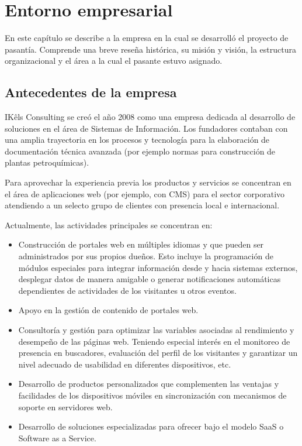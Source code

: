 \chapter{Entorno empresarial} \label{entornoEmpresarial}
En este capítulo se describe a la empresa en la cual se desarrolló el proyecto de pasantía. Comprende una breve reseña histórica, su misión y visión, la estructura organizacional y el área a la cual el pasante estuvo asignado.

\section{Antecedentes de la empresa} \label{antecedentesEmpresa}
IKêls Consulting \cite{ikelsAbout} se creó el año 2008 como una empresa dedicada al desarrollo de soluciones en el área de Sistemas de Información. Los fundadores contaban con una amplia trayectoria en los procesos y tecnología para la elaboración de documentación técnica avanzada (por ejemplo normas para construcción de plantas petroquímicas).

Para aprovechar la experiencia previa los productos y servicios se concentran en el área de aplicaciones web (por ejemplo, con \ac{CMS}) para el sector corporativo atendiendo a un selecto grupo de clientes con presencia local e internacional.

Actualmente, las actividades principales se concentran en:

\begin{itemize}
  \item Construcción de portales web en múltiples idiomas y que pueden ser administrados por sus propios dueños. Esto incluye la programación de módulos especiales para integrar información desde y hacia sistemas externos, desplegar datos de manera amigable o generar notificaciones automáticas dependientes de actividades de los visitantes u otros eventos.
  \item Apoyo en la gestión de contenido de portales web.
  \item Consultoría y gestión para optimizar las variables asociadas al rendimiento y desempeño de las páginas web. Teniendo especial interés en el monitoreo de presencia en buscadores, evaluación del perfil de los visitantes y garantizar un nivel adecuado de usabilidad en diferentes dispositivos, etc.
  \item Desarrollo de productos personalizados que complementen las ventajas y facilidades de los dispositivos móviles en sincronización con mecanismos de soporte en servidores web.
  \item Desarrollo de soluciones especializadas para ofrecer bajo el modelo SaaS o Software as a Service.
\end{itemize}

